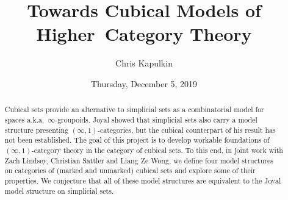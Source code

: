 \documentclass{UAmathtalk}
\author{Chris Kapulkin}
\title{Towards Cubical Models of Higher~Category Theory}
\date{Thursday, December 5, 2019}
\begin{document}
\maketitle

\begin{abstract}
Cubical sets provide an alternative to simplicial sets as a combinatorial model for spaces a.k.a.\ $\infty$-groupoids. Joyal showed that simplicial sets also carry a model structure presenting $(\infty,1)$-categories, but the cubical counterpart of his result has not been established. The goal of this project is to develop workable foundations of $(\infty,1)$-category theory in the category of cubical sets. To this end, in joint work with Zach Lindsey, Christian Sattler and Liang Ze Wong, we define four model structures on categories of (marked and unmarked) cubical sets and explore some of their properties. We conjecture that all of these model structures are equivalent to the Joyal model structure on simplicial sets.
\end{abstract}
\end{document}
